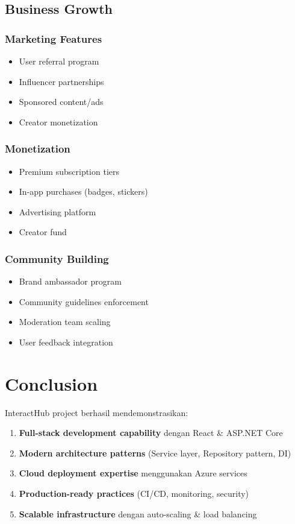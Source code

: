 \subsection{Business Growth}

\subsubsection{Marketing Features}
\begin{itemize}
    \item User referral program
    \item Influencer partnerships
    \item Sponsored content/ads
    \item Creator monetization
\end{itemize}

\subsubsection{Monetization}
\begin{itemize}
    \item Premium subscription tiers
    \item In-app purchases (badges, stickers)
    \item Advertising platform
    \item Creator fund
\end{itemize}

\subsubsection{Community Building}
\begin{itemize}
    \item Brand ambassador program
    \item Community guidelines enforcement
    \item Moderation team scaling
    \item User feedback integration
\end{itemize}

\section{Conclusion}

InteractHub project berhasil mendemonstrasikan:

\begin{enumerate}
    \item \textbf{Full-stack development capability} dengan React \& ASP.NET Core
    \item \textbf{Modern architecture patterns} (Service layer, Repository pattern, DI)
    \item \textbf{Cloud deployment expertise} menggunakan Azure services
    \item \textbf{Production-ready practices} (CI/CD, monitoring, security)
    \item \textbf{Scalable infrastructure} dengan auto-scaling \& load balancing
\end{enumerate}

